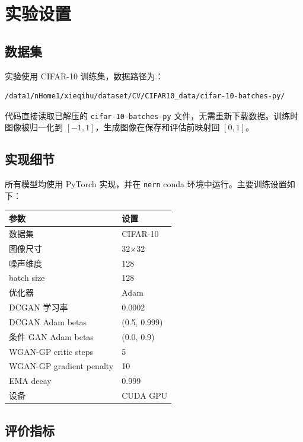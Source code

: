 \documentclass[UTF8,a4paper,12pt]{ctexart}
\begin{document}
\section{实验设置}

\subsection{数据集}

实验使用 CIFAR-10 训练集，数据路径为：


\begin{lstlisting}
/data1/nHome1/xieqihu/dataset/CV/CIFAR10_data/cifar-10-batches-py/
\end{lstlisting}


代码直接读取已解压的 \texttt{cifar-10-batches-py} 文件，无需重新下载数据。训练时图像被归一化到 $[-1, 1]$，生成图像在保存和评估前映射回 $[0, 1]$。


\subsection{实现细节}

所有模型均使用 PyTorch 实现，并在 \texttt{nern} conda 环境中运行。主要训练设置如下：


\begin{table}[H]
\centering
\small
\begin{tabularx}{\linewidth}{lX}
\toprule
参数 & 设置 \\
\midrule
数据集 & CIFAR-10 \\
图像尺寸 & 32×32 \\
噪声维度 & 128 \\
batch size & 128 \\
优化器 & Adam \\
DCGAN 学习率 & 0.0002 \\
DCGAN Adam betas & (0.5, 0.999) \\
条件 GAN Adam betas & (0.0, 0.9) \\
WGAN-GP critic steps & 5 \\
WGAN-GP gradient penalty & 10 \\
EMA decay & 0.999 \\
设备 & CUDA GPU \\
\bottomrule
\end{tabularx}
\end{table}


\subsection{评价指标}
\end{document}
